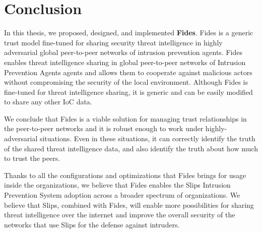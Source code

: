 \chapter{Conclusion}
\label{ch:conclusion}

In this thesis, we proposed, designed, and implemented \textbf{Fides}. Fides is a generic trust model fine-tuned for sharing security threat intelligence in highly adversarial global peer-to-peer networks of intrusion prevention agents.
Fides enables threat intelligence sharing in global peer-to-peer networks of Intrusion Prevention Agents agents and allows them to cooperate against malicious actors without compromising the security of the local environment. 
Although Fides is fine-tuned for threat intelligence sharing, it is generic and can be easily modified to share any other IoC data.

We conclude that Fides is a viable solution for managing trust relationships in the peer-to-peer networks and it is robust enough to work under highly-adversarial situations. Even in these situations, it can correctly identify the truth of the shared threat intelligence data, and also identify the truth about how much to trust the peers.

Thanks to all the configurations and optimizations that Fides brings for usage inside the organizations, we believe that Fides enables the Slips Intrusion Prevention System adoption across a broader spectrum of organizations.
We believe that Slips, combined with Fides, will enable more possibilities for sharing threat intelligence over the internet and improve the overall security of the networks that use Slips for the defense against intruders.


